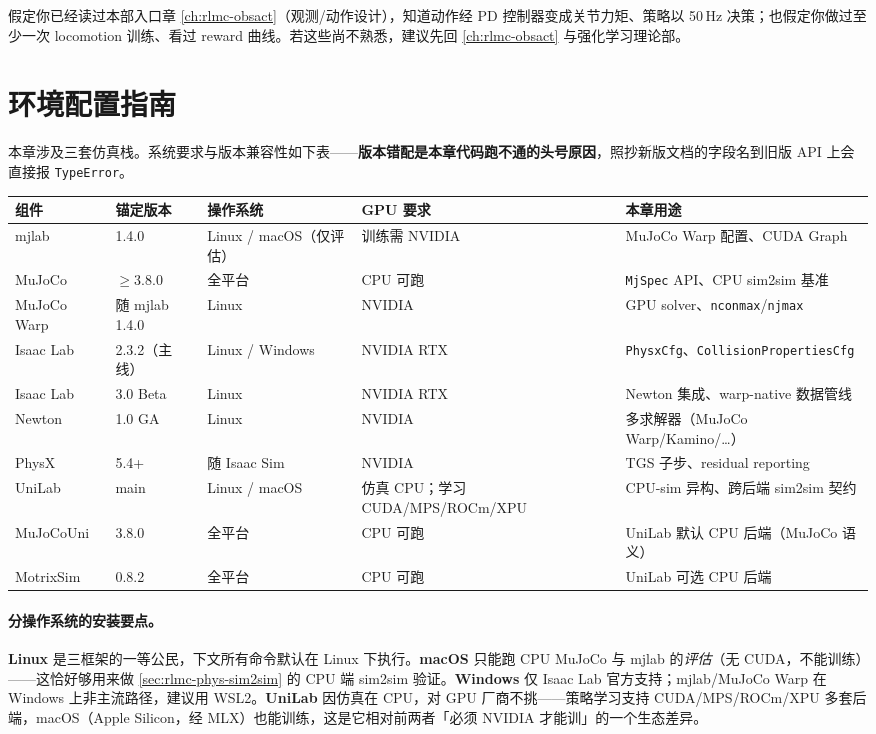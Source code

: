 假定你已经读过本部入口章 \cref{ch:rlmc-obsact}（观测/动作设计），知道动作经 PD 控制器变成关节力矩、策略以 50\,Hz 决策；也假定你做过至少一次 locomotion 训练、看过 reward 曲线。若这些尚不熟悉，建议先回 \cref{ch:rlmc-obsact} 与强化学习理论部。

\section*{环境配置指南}
\label{sec:rlmc-phys-env}

本章涉及三套仿真栈。系统要求与版本兼容性如下表——\textbf{版本错配是本章代码跑不通的头号原因}，照抄新版文档的字段名到旧版 API 上会直接报 \verb|TypeError|。

\begin{center}
\small
\begin{tabular}{@{}lllll@{}}
\toprule
组件 & 锚定版本 & 操作系统 & GPU 要求 & 本章用途 \\
\midrule
mjlab & 1.4.0 & Linux / macOS（仅评估） & 训练需 NVIDIA & MuJoCo Warp 配置、CUDA Graph \\
MuJoCo & $\ge 3.8.0$ & 全平台 & CPU 可跑 & \verb|MjSpec| API、CPU sim2sim 基准 \\
MuJoCo Warp & 随 mjlab 1.4.0 & Linux & NVIDIA & GPU solver、\verb|nconmax|/\verb|njmax| \\
Isaac Lab & 2.3.2（主线） & Linux / Windows & NVIDIA RTX & \verb|PhysxCfg|、\verb|CollisionPropertiesCfg| \\
Isaac Lab & 3.0 Beta & Linux & NVIDIA RTX & Newton 集成、warp-native 数据管线 \\
Newton & 1.0 GA & Linux & NVIDIA & 多求解器（MuJoCo Warp/Kamino/\dots） \\
PhysX & 5.4+ & 随 Isaac Sim & NVIDIA & TGS 子步、residual reporting \\
UniLab & main & Linux / macOS & 仿真 CPU；学习 CUDA/MPS/ROCm/XPU & CPU-sim 异构、跨后端 sim2sim 契约 \\
MuJoCoUni & 3.8.0 & 全平台 & CPU 可跑 & UniLab 默认 CPU 后端（MuJoCo 语义） \\
MotrixSim & 0.8.2 & 全平台 & CPU 可跑 & UniLab 可选 CPU 后端 \\
\bottomrule
\end{tabular}
\end{center}

\paragraph{分操作系统的安装要点。}
\textbf{Linux} 是三框架的一等公民，下文所有命令默认在 Linux 下执行。\textbf{macOS} 只能跑 CPU MuJoCo 与 mjlab 的\emph{评估}（无 CUDA，不能训练）——这恰好够用来做 \cref{sec:rlmc-phys-sim2sim} 的 CPU 端 sim2sim 验证。\textbf{Windows} 仅 Isaac Lab 官方支持；mjlab/MuJoCo Warp 在 Windows 上非主流路径，建议用 WSL2。\textbf{UniLab} 因仿真在 CPU，对 GPU 厂商不挑——策略学习支持 CUDA/MPS/ROCm/XPU 多套后端，macOS（Apple Silicon，经 MLX）也能训练，这是它相对前两者「必须 NVIDIA 才能训」的一个生态差异。

